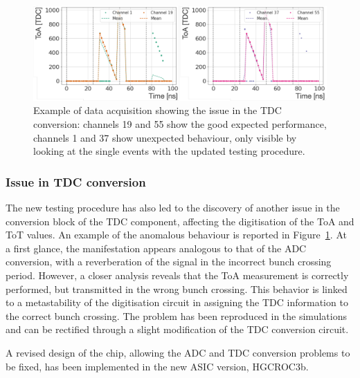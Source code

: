 \begin{figure}
    \centering
    \includegraphics[width=0.8\linewidth]{Figures/HGCAL/TDCIssue.pdf}
    \caption{Example of data acquisition showing the issue in the TDC conversion: channels 19 and 55 show the good expected performance, channels 1 and 37 show unexpected behaviour, only visible by looking at the single events with the updated testing procedure.}
    \label{fig:TDCIssue}
\end{figure}

\subsubsection{Issue in TDC conversion}
\label{subsubsec:Issue in TDC conversion}

The new testing procedure has also led to the discovery of another issue in the conversion block of the TDC component, affecting the digitisation of the ToA and ToT values. 
An example of the anomalous behaviour is reported in Figure~\ref{fig:TDCIssue}. At a first glance, the manifestation appears analogous to that of the ADC conversion, with a reverberation of the signal in the incorrect bunch crossing period. However, a closer analysis reveals that the ToA measurement is correctly performed, but transmitted in the wrong bunch crossing. 
This behavior is linked to a metastability of the digitisation circuit in assigning the TDC information to the correct bunch crossing. The problem has been reproduced in the simulations and can be rectified through a slight modification of the TDC conversion circuit.

\bigbreak

A revised design of the chip, allowing the ADC and TDC conversion problems to be fixed, has been implemented in the new ASIC version, HGCROC3b. 


